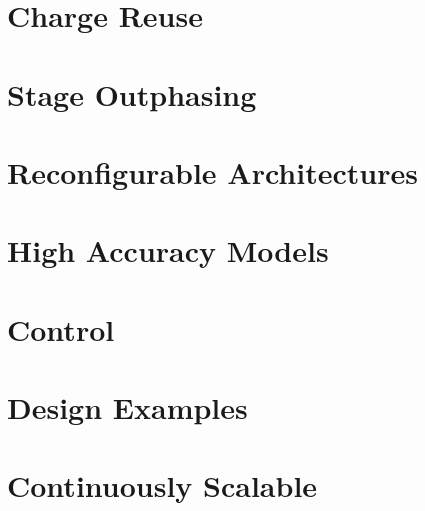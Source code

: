 \documentclass{report}
\begin{document}
	\chapter{Charge Reuse}
	\chapter{Stage Outphasing}
	\chapter{Reconfigurable Architectures}
	\chapter{High Accuracy Models}
	\chapter{Control}
	\chapter{Design Examples}
	\chapter{Continuously Scalable}
	
\end{document}
